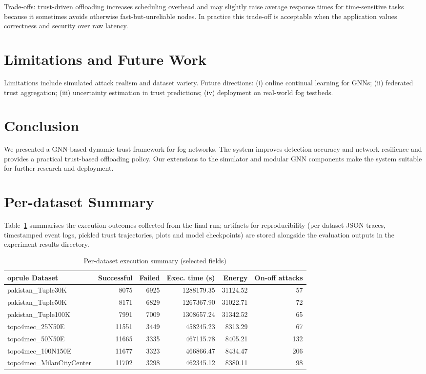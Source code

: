 \documentclass[12pt,a4paper]{article}
\begin{document}
Trade-offs: trust-driven offloading increases scheduling overhead and may slightly raise average response times for time-sensitive tasks because it sometimes avoids otherwise fast-but-unreliable nodes. In practice this trade-off is acceptable when the application values correctness and security over raw latency.

\section{Limitations and Future Work}
Limitations include simulated attack realism and dataset variety. Future directions: (i) online continual learning for GNNs; (ii) federated trust aggregation; (iii) uncertainty estimation in trust predictions; (iv) deployment on real-world fog testbeds.

\section{Conclusion}
We presented a GNN-based dynamic trust framework for fog networks. The system improves detection accuracy and network resilience and provides a practical trust-based offloading policy. Our extensions to the simulator and modular GNN components make the system suitable for further research and deployment.



\appendix
\section{Per-dataset Summary}
Table~\ref{tab:datasets_summary} summarises the execution outcomes collected from the final run; artifacts for reproducibility (per-dataset JSON traces, timestamped event logs, pickled trust trajectories, plots and model checkpoints) are stored alongside the evaluation outputs in the experiment results directory.
\begin{table}[H]
\centering
\caption{Per-dataset execution summary (selected fields)}
\label{tab:datasets_summary}
\begin{tabular}{lrrrrr}
	oprule
Dataset & Successful & Failed & Exec. time (s) & Energy & On-off attacks \\
\midrule
pakistan\_Tuple30K & 8075 & 6925 & 1288179.35 & 31124.52 & 57 \\
pakistan\_Tuple50K & 8171 & 6829 & 1267367.90 & 31022.71 & 72 \\
pakistan\_Tuple100K & 7991 & 7009 & 1308657.24 & 31342.52 & 65 \\
topo4mec\_25N50E & 11551 & 3449 & 458245.23 & 8313.29 & 67 \\
topo4mec\_50N50E & 11665 & 3335 & 467115.78 & 8405.21 & 132 \\
topo4mec\_100N150E & 11677 & 3323 & 466866.47 & 8434.47 & 206 \\
topo4mec\_MilanCityCenter & 11702 & 3298 & 462345.12 & 8380.11 & 98 \\
\bottomrule
\end{tabular}
\end{table}
\end{document}
